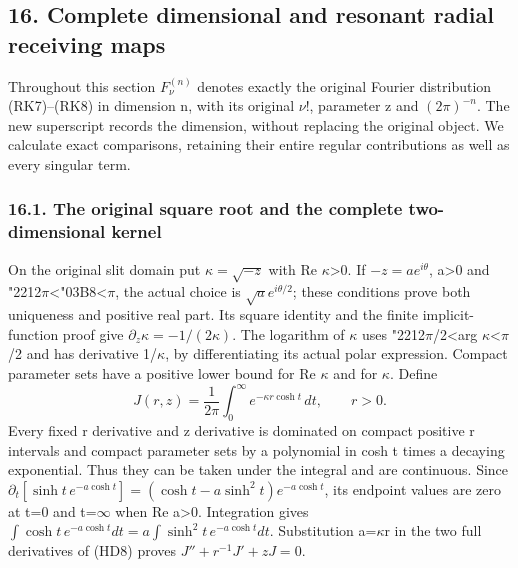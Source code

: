 \documentclass[
  11pt,
]{article}
\begin{document}
\subsection{16. Complete dimensional and resonant radial receiving
maps}\label{complete-dimensional-and-resonant-radial-receiving-maps}

Throughout this section \(F_\nu^{(n)}\) denotes exactly the original
Fourier distribution (RK7)--(RK8) in dimension n, with its original
\(\nu!\), parameter z and \((2\pi)^{-n}\). The new superscript records
the dimension, without replacing the original object. We calculate exact
comparisons, retaining their entire regular contributions as well as
every singular term.

\subsubsection{16.1. The original square root and the complete
two-dimensional
kernel}\label{the-original-square-root-and-the-complete-two-dimensional-kernel}

On the original slit domain put \(\kappa=\sqrt{-z}\) with Re
\ensuremath{\kappa}\textgreater0. If \(-z=ae^{i\theta}\), a\textgreater0 and
{\ReaderSymbols\char"2212}\ensuremath{\pi}\textless {\ReaderSymbols\char"03B8}\textless \ensuremath{\pi}, the actual choice is
\(\sqrt a e^{i\theta/2}\); these conditions prove both uniqueness and
positive real part. Its square identity and the finite implicit-function
proof give \(\partial_z\kappa=-1/(2\kappa)\). The logarithm of \ensuremath{\kappa} uses
{\ReaderSymbols\char"2212}\ensuremath{\pi}/2\textless arg \ensuremath{\kappa}\textless \ensuremath{\pi}/2 and has derivative 1/\ensuremath{\kappa}, by
differentiating its actual polar expression. Compact parameter sets have
a positive lower bound for Re \ensuremath{\kappa} and for \textbar \ensuremath{\kappa}\textbar. Define \[
J(r,z)=\frac1{2\pi}\int_0^\infty
                              e^{-\kappa r\cosh t}\,dt,
\qquad r>0.
\tag{HD8}
\] Every fixed r derivative and z derivative is dominated on compact
positive r intervals and compact parameter sets by a polynomial in cosh
t times a decaying exponential. Thus they can be taken under the
integral and are continuous. Since \(\partial_t[\sinh t\,e^{-a\cosh t}]
=(\cosh t-a\sinh^2t)e^{-a\cosh t}\), its endpoint values are zero at t=0
and t=\ensuremath{\infty} when Re a\textgreater0. Integration gives
\(\int\cosh t\,e^{-a\cosh t}dt=a\int\sinh^2t\,e^{-a\cosh t}dt\).
Substitution a=\ensuremath{\kappa}r in the two full derivatives of (HD8) proves
\(J''+r^{-1}J'+zJ=0\).
\end{document}
